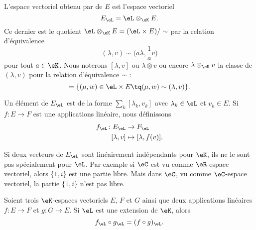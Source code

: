 \begin{definition}
	L'espace vectoriel obtenu par  de \( E\) est l'espace vectoriel
	\begin{equation}
		E_{\eL}=\eL\otimes_{\eK}E.
	\end{equation}
	Ce dernier est le quotient \( \eL\otimes_{\eK}E=(\eL\times E)/\sim\) par la relation d'équivalence
	\begin{equation}
		(\lambda,v)\sim\big( a\lambda,\frac{1}{ a }v \big)
	\end{equation}
	pour tout \( a\in \eK\). Nous noterons \( [\lambda,v]\) ou \( \lambda\otimes v\) ou encore \( \lambda\otimes_{\eK}v\) la classe de \( (\lambda,v)\) pour la relation d'équivalence \( \sim\) :
	\begin{equation}
		[\lambda, v]=\{ (\mu, w)\in \eL\times E\tq (\mu,w)\sim(\lambda,v) \}.
	\end{equation}
\end{definition}
Un élément de \( E_{\eL}\) est de la forme \( \sum_k[\lambda_k,v_k]\) avec \( \lambda_k\in \eL\) et \( v_k\in E\). Si \( f\colon E\to F\) est une applications linéaire, nous définissons
\begin{equation}        \label{EQooYGVHooHYbMHX}
	\begin{aligned}
		f_{\eL}\colon E_{\eL} & \to F_{\eL}             \\
		[\lambda,v]           & \mapsto [\lambda,f(v)].
	\end{aligned}
\end{equation}

\begin{remark}
	Si deux vecteurs de \( E_{\eL}\) sont linéairement indépendants pour \( \eK\), ils ne le sont pas spécialement pour \( \eL\). Par exemple si \( \eC\) est vu comme \( \eR\)-espace vectoriel, alors \( \{ 1,i \}\) est une partie libre. Mais dans \( \eC\), vu comme \( \eC\)-espace vectoriel, la partie \( \{ 1,i \}\) n'est pas libre.
\end{remark}

\begin{lemma}       \label{LEMooJIGTooMqiJSN}
	Soient trois \( \eK\)-espaces vectoriels \( E\), \( F\) et \( G\) ainsi que deux applications linéaires \( f\colon E\to F\) et \( g\colon G\to E\). Si \( \eL\) est une extension de \( \eK\), alors
	\begin{equation}
		f_{\eL}\circ g_{\eL}=(f\circ g)_{\eL}.
	\end{equation}
\end{lemma}

